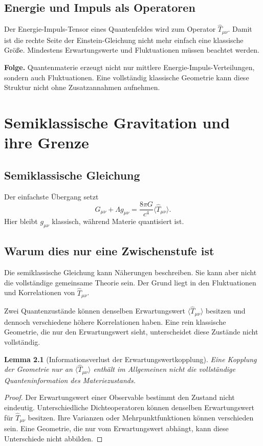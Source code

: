 \documentclass[11pt,a4paper,openany]{book}
\newtheorem{lemma}{Lemma}[chapter]
\theoremstyle{remark}
\begin{document}
\section{Energie und Impuls als Operatoren}
Der Energie-Impuls-Tensor eines Quantenfeldes wird zum Operator $\hat T_{\mu\nu}$. Damit ist die rechte Seite der Einstein-Gleichung nicht mehr einfach eine klassische Größe. Mindestens Erwartungswerte und Fluktuationen müssen beachtet werden.

\begin{merkkasten}
\textbf{Folge.} Quantenmaterie erzeugt nicht nur mittlere Energie-Impuls-Verteilungen, sondern auch Fluktuationen. Eine vollständig klassische Geometrie kann diese Struktur nicht ohne Zusatzannahmen aufnehmen.
\end{merkkasten}

\chapter{Semiklassische Gravitation und ihre Grenze}
\section{Semiklassische Gleichung}
Der einfachste Übergang setzt
\begin{equation}
G_{\mu\nu}+\Lambda g_{\mu\nu}=\frac{8\pi G}{c^4}\langle \hat T_{\mu\nu}\rangle.
\end{equation}
Hier bleibt $g_{\mu\nu}$ klassisch, während Materie quantisiert ist.

\section{Warum dies nur eine Zwischenstufe ist}
Die semiklassische Gleichung kann Näherungen beschreiben. Sie kann aber nicht die vollständige gemeinsame Theorie sein. Der Grund liegt in den Fluktuationen und Korrelationen von $\hat T_{\mu\nu}$.

Zwei Quantenzustände können denselben Erwartungswert $\langle \hat T_{\mu\nu}\rangle$ besitzen und dennoch verschiedene höhere Korrelationen haben. Eine rein klassische Geometrie, die nur den Erwartungswert sieht, unterscheidet diese Zustände nicht vollständig.

\begin{lemma}[Informationsverlust der Erwartungswertkopplung]
Eine Kopplung der Geometrie nur an $\langle \hat T_{\mu\nu}\rangle$ enthält im Allgemeinen nicht die vollständige Quanteninformation des Materiezustands.
\end{lemma}
\begin{proof}
Der Erwartungswert einer Observable bestimmt den Zustand nicht eindeutig. Unterschiedliche Dichteoperatoren können denselben Erwartungswert für $\hat T_{\mu\nu}$ besitzen. Ihre Varianzen oder Mehrpunktfunktionen können verschieden sein. Eine Geometrie, die nur vom Erwartungswert abhängt, kann diese Unterschiede nicht abbilden.
\end{proof}
\end{document}

